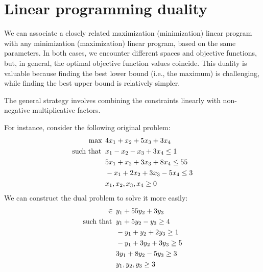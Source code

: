 \section{Linear programming duality}

We can associate a closely related maximization (minimization) linear program with any minimization (maximization) linear program, based on the same parameters.
In both cases, we encounter different spaces and objective functions, but, in general, the optimal objective function values coincide.
This duality is valuable because finding the best lower bound (i.e., the maximum) is challenging, while finding the best upper bound is relatively simpler.

The general strategy involves combining the constraints linearly with non-negative multiplicative factors.
\begin{example}
    For instance, consider the following original problem:
    \begin{align*}
        \max                      \:&\: 4x_1+x_2+5x_3+3x_4          \\
        \textnormal{such that }     &\: x_1-x_2-x_3+3x_4 \leq 1     \\
                                    &\: 5x_1+x_2+3x_3+8x_4 \leq 55  \\
                                    &\: -x_1+2x_2+3x_3-5x_4 \leq 3  \\
                                    &\: x_1,x_2,x_3,x_4 \geq 0      
    \end{align*}
    We can construct the dual problem to solve it more easily:
    \begin{align*}
        \in                       \:&\: y_1+55y_2+3y_3          \\
        \textnormal{such that }     &\: y_1+5y_2-y_3 \geq 4     \\
                                    &\: -y_1+y_2+2y_3 \geq 1  \\
                                    &\: -y_1+3y_2+3y_3 \geq 5  \\
                                    &\: 3y_1+8y_2-5y_3 \geq 3 \\   
                                    &\: y_1,y_2,y_3 \geq 3 \\
    \end{align*}
\end{example}
























